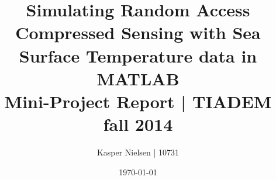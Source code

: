 \documentclass[11pt]{article}
\title{
	Simulating Random Access Compressed Sensing with Sea Surface Temperature data in MATLAB
	\\
	\vspace{5mm}
	\large{Mini-Project Report | TIADEM fall 2014}
}
\author{Kasper Nielsen | 10731}
\date{\today}
\begin{document}
\maketitle



\listoffixmes
\newpage

\tableofcontents

\newpage


\newpage


\newpage


\newpage


% 

\newpage


\newpage


\newpage



\newpage
\appendix

\end{document}
